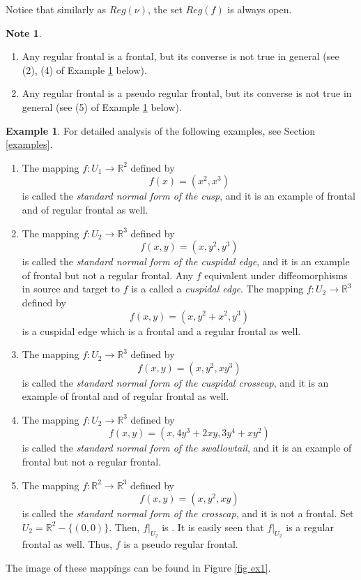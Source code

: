 \documentclass{amsart}
\theoremstyle{definition}
\theoremstyle{definition}
\newtheorem{example}{Example}
\theoremstyle{definition}
\newtheorem{note}{Note}
\newcommand{\ch}[1]{{\color{black} #1}}
\begin{document}
Notice that similarly as $Reg(\nu)$, the set $Reg(f)$ is always open.   
\begin{note}
\begin{enumerate}
\item[(1)] Any regular frontal is a frontal, but its converse is not true in general 
(see (2), (4) of Example \ref{example1} below).   \\ 
\item[(2)] Any regular frontal is a pseudo regular frontal, 
but its converse is not true in general (see (5) of Example \ref{example1} below).  
\end{enumerate}
\end{note}

\begin{example}\label{example1}  
For detailed analysis of the following examples, see Section \ref{examples}.
\begin{enumerate}
\item[(1)] The mapping $f: U_1\to \mathbb{R}^2$ defined by 
\[
f(x)=\left(x^2, x^3\right)
\]
is called the \textit{standard normal form of the cusp}, and it is an example of frontal and of regular frontal as well. 
 \item[(2)] The mapping $f: U_2\to \mathbb{R}^3$ defined by 
\[
f(x,y)=\left(x, y^2, y^3\right)
\]
is called the \textit{standard normal form of the cuspidal edge}, 
and it is an example of frontal but {not a regular frontal}. Any $f$ equivalent under diffeomorphisms in source and target to $f$ is a called a \textit{cuspidal edge}. The mapping $f: U_2\to \mathbb{R}^3$ defined by 
\[
f(x,y)=\left(x, y^2+x^2, y^3\right)
\]    
is a cuspidal edge which is a frontal and a regular frontal as well.
 \item[(3)] The mapping $f: U_2\to \mathbb{R}^3$ defined by 
\[
f(x, y)=\left(x, y^2, xy^3\right)
\]
is called the \textit{standard normal form of the cuspidal crosscap}, 
and it is an example of 
frontal and {of regular frontal} as well.     
\item[(4)] The mapping $f: U_2\to \mathbb{R}^3$ defined by 
\[
f(x, y)=\left(x, 4y^3+2xy, 3y^4+xy^2\right)
\]
is called the \textit{standard normal form of the swallowtail}, 
and it is an example of 
frontal but {not a regular frontal}.     
\item[(5)] The mapping $f: \mathbb{R}^2\to \mathbb{R}^3$ defined by 
\[
f(x, y)=\left(x, y^2, xy\right)
\]
is called the \textit{standard normal form of the crosscap}, 
and it is not a frontal.    Set $U_2=\mathbb{R}^2-\{(0,0)\}$.    
Then, $f|_{{U_2}}$ is .    
{It is easily seen that $f|_{{U_2}}$ is a regular  
frontal} as well.    
{Thus, $f$ is a pseudo regular frontal.}     
\end{enumerate}
The image of these mappings can be found \ch{in} Figure \ref{fig ex1}.
\end{example} 
\end{document}
